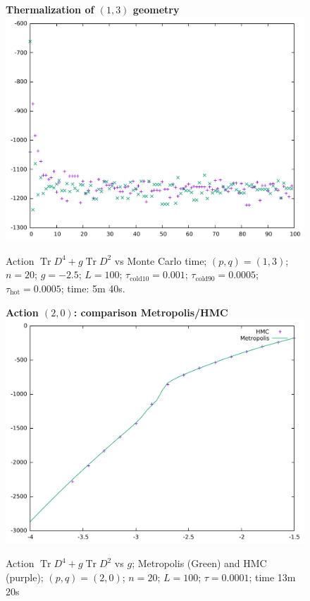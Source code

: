 \documentclass[12pt,a4paper]{article}
\DeclareMathOperator{\Tr}{Tr}
\begin{document}
\newpage

\begin{figure}[hp]
\centering
\textbf{Thermalization of $(1,3)$ geometry}
\includegraphics[width=1\linewidth]{p1q3n20g25.pdf}
\caption{Action $\Tr D^4 + g\Tr D^2$ vs Monte Carlo time; $(p,q)=(1,3)$; $n=20$; $g=-2.5$; $L=100$; $\tau_\text{cold10} = 0.001$; $\tau_\text{cold90} = 0.0005$; $\tau_\text{hot} = 0.0005$; time: 5m 40s.}
\end{figure}

\newpage

\begin{figure}[hp]
\centering
\textbf{Action $(2,0)$: comparison Metropolis/HMC}
\includegraphics[width=1\linewidth]{p2q0n20S.pdf}
\caption{Action $\Tr D^4 + g\Tr D^2$ vs $g$; Metropolis (Green) and HMC (purple); $(p,q)=(2,0)$; $n=20$; $L=100$; $\tau = 0.0001$; time 13m 20s}
\end{figure}
\end{document}
